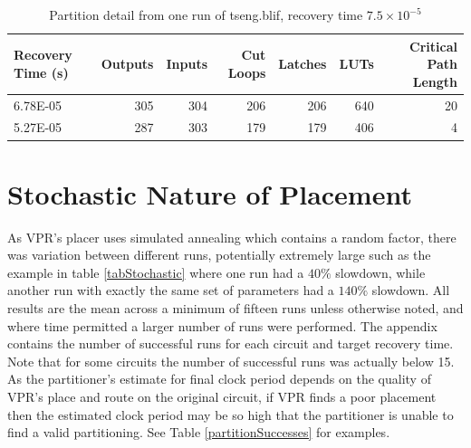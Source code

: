 \documentclass[12pt,final,oneside]{dwThesis} %
\begin{document}
   \begin{table}
      \begin{center}

      \begin{tabular}
         {lrrrrrr} \toprule Recovery Time (s) &
         Outputs & Inputs & Cut Loops & Latches & \glspl{LUT} & Critical
         Path Length\\
         \midrule 6.78E-05 & 305 & 304 & 206 & 206 & 640 &
         20\\
         5.27E-05 & 287 & 303 & 179 & 179 & 406 & 4\\
         \bottomrule

      \end{tabular}
      \caption{Partition detail from one run of tseng.blif,
         recovery time $7.5\times10^{-5}$}\label{tabSanityPartitions}

   \end{center}\end{table}



   \section{Stochastic Nature of Placement}\label{stochastic}
   As \gls{VPR}'s placer uses
   simulated annealing which contains a random factor, there was variation
   between different runs, potentially extremely large such as the example in
   table \ref{tabStochastic} where one run had a $40\%$ slowdown, while another
   run with exactly the same set of parameters had a $140\%$ slowdown.
   All results are the mean across a minimum of fifteen runs unless otherwise noted, and where time permitted a larger number of runs were performed.
   The appendix contains the number of successful runs for each circuit and target recovery time.
   Note that for some circuits the number of successful runs was actually below 15.
   As the partitioner's estimate for final clock period depends on the quality of \gls{VPR}'s place and route on the original circuit,
   if \gls{VPR} finds a poor placement then the estimated clock period may be so high that the partitioner is unable to find a valid partitioning.
   See Table \ref{partitionSuccesses} for examples.
   
\end{document}
